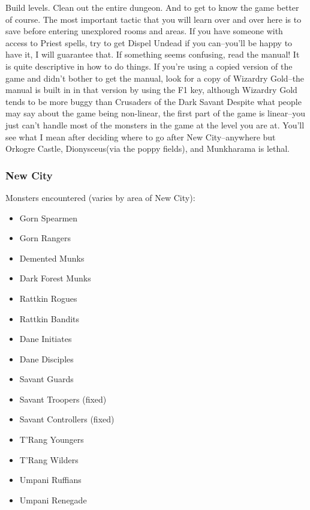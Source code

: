 \documentclass[12pt]{article}
\providecommand{\tightlist}{%
  \setlength{\itemsep}{0pt}\setlength{\parskip}{0pt}}
\begin{document}
Build levels. Clean out the entire dungeon. And to get to know the game
better of course. The most important tactic that you will learn over and over
here is to save before entering unexplored rooms and areas. If you have
someone with access to Priest spells, try to get Dispel Undead if you
can--you'll be happy to have it, I will guarantee that. If something seems
confusing, read the manual!  It is quite descriptive in how to do things. If
you're using a copied version of the game and didn't bother to get the
manual, look for a copy of Wizardry Gold--the manual is built in in that
version by using the F1 key, although Wizardry Gold tends to be more buggy
than Crusaders of the Dark Savant Despite what people may say about the game
being non-linear, the first part of the game is linear--you just can't handle
most of the monsters in the game at the level you are at. You'll see what I
mean after deciding where to go after New City--anywhere but Orkogre Castle,
Dionysceus(via the poppy fields), and Munkharama is lethal.

\subsubsection{New City}\label{new-city}

Monsters encountered (varies by area of New City):

\begin{multicols}{2}
\begin{itemize}
\tightlist
\item
  Gorn Spearmen
\item
  Gorn Rangers
\item
  Demented Munks
\item
  Dark Forest Munks
\item
  Rattkin Rogues
\item
  Rattkin Bandits
\item
  Dane Initiates
\item
  Dane Disciples
\item
  Savant Guards
\item
  Savant Troopers (fixed)
\item
  Savant Controllers (fixed)
\item
  T'Rang Youngers
\item
  T'Rang Wilders
\item
  Umpani Ruffians
\item
  Umpani Renegade
\end{itemize}
\end{multicols}
\end{document}
